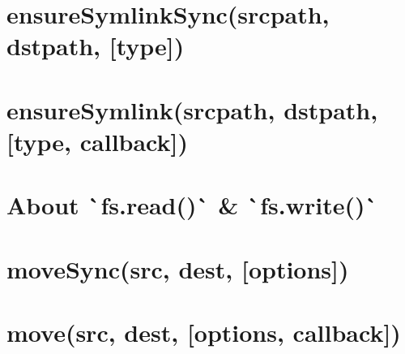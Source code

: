 \documentclass[twoside]{book}
\newcommand{\+}{\discretionary{\mbox{\scriptsize$\hookleftarrow$}}{}{}}
\begin{document}
\chapter{ensure\+Symlink\+Sync(srcpath, dstpath, \mbox{[}type\mbox{]})}
\label{md_dsmacc_examples_DRmerge_node_modules_electron-packager_node_modules_electron-download_node_mo5ffa3ad4090b06c4d8bbea90f921f435}

\chapter{ensure\+Symlink(srcpath, dstpath, \mbox{[}type, callback\mbox{]})}
\label{md_dsmacc_examples_DRmerge_node_modules_electron-packager_node_modules_electron-download_node_mo430a3255c664c21263e9c12f7cf467c2}

\chapter{About \`{}fs.read()\`{} \& \`{}fs.write()\`{}}
\label{md_dsmacc_examples_DRmerge_node_modules_electron-packager_node_modules_electron-download_node_mof667ca4bb0d00e7b3b1d3242ae97f836}

\chapter{move\+Sync(src, dest, \mbox{[}options\mbox{]})}
\label{md_dsmacc_examples_DRmerge_node_modules_electron-packager_node_modules_electron-download_node_modules_fs-extra_docs_move-sync}

\chapter{move(src, dest, \mbox{[}options, callback\mbox{]})}
\label{md_dsmacc_examples_DRmerge_node_modules_electron-packager_node_modules_electron-download_node_modules_fs-extra_docs_move}

\end{document}
